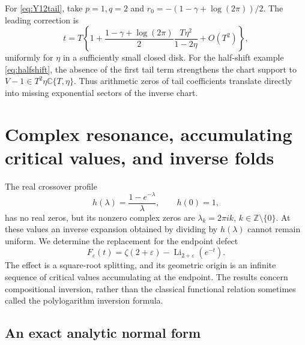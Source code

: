 \documentclass[11pt,a4paper]{article}
\numberwithin{equation}{section}
\theoremstyle{definition}
\theoremstyle{remark}
\DeclareMathOperator{\Li}{Li}
\newcommand{\C}{\mathbb C}
\begin{document}
For \eqref{eq:Y12tail}, take $p=1,q=2$ and
$r_0=-(1-\gamma+\log(2\pi))/2$. The leading correction is
\begin{equation}\label{eq:jet-inverse-example}
 t=T\left\{1+
 \frac{1-\gamma+\log(2\pi)}2
 \frac{T\eta^2}{1-2\eta}+O(T^2)\right\},
\end{equation}
uniformly for $\eta$ in a sufficiently small closed disk. For the
half-shift example \eqref{eq:halfshift}, the absence of the first
tail term strengthens the chart support to $V-1\in T^2\eta\C\{T,\eta\}$.
Thus arithmetic zeros of tail coefficients translate directly into
missing exponential sectors of the inverse chart.


\section{Complex resonance, accumulating critical values, and inverse folds}
\label{sec:complex-resonance}

The real crossover profile
\[
 h(\lambda)=\frac{1-e^{-\lambda}}{\lambda},\qquad h(0)=1,
\]
has no real zeros, but its nonzero complex zeros are
$\lambda_k=2\pi i k$, $k\in\mathbb Z\setminus\{0\}$.  At these values
an inverse expansion obtained by dividing by $h(\lambda)$ cannot remain
uniform.  We determine the replacement for the endpoint defect
\begin{equation}\label{cx:defect}
 F_\varepsilon(t)
   =\zeta(2+\varepsilon)-\Li_{2+\varepsilon}(e^{-t}).
\end{equation}
The effect is a square-root splitting, and its geometric origin is an
infinite sequence of critical values accumulating at the endpoint.
The results concern compositional inversion, rather than the classical
functional relation sometimes called the polylogarithm inversion formula.

\subsection{An exact analytic normal form}
\end{document}
